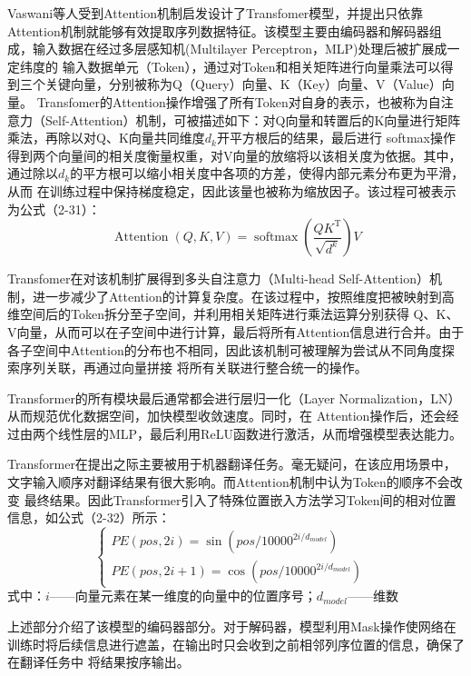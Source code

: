 Vaswani等人\cite{vaswani2017attention}受到Attention机制启发设计了Transfomer模型，并提出只依靠
Attention机制就能够有效提取序列数据特征。该模型主要由编码器和解码器组成，输入数据在经过多层感知机(Multilayer Perceptron，MLP)处理后被扩展成一定纬度的
输入数据单元（Token），通过对Token和相关矩阵进行向量乘法可以得到三个关键向量，分别被称为Q（Query）向量、K（Key）向量、V（Value）向量。
Transfomer的Attention操作增强了所有Token对自身的表示，也被称为自注意力（Self-Attention）机制，可被描述如下：对Q向量和转置后的K向量进行矩阵乘法，再除以对Q、K向量共同维度$d_{k}$开平方根后的结果，最后进行
softmax操作得到两个向量间的相关度衡量权重，对V向量的放缩将以该相关度为依据。其中，通过除以$d_{k}$的平方根可以缩小相关度中各项的方差，使得内部元素分布更为平滑，从而
在训练过程中保持梯度稳定，因此该量也被称为缩放因子。该过程可被表示为公式（2-31）：
\begin{equation}
    \operatorname{Attention}(Q,K,V)=\operatorname{softmax}\left(\frac{QK^\mathrm{T}}{\sqrt{d^k}}\right)V
\end{equation}

Transfomer在对该机制扩展得到多头自注意力（Multi-head Self-Attention）机制，进一步减少了Attention的计算复杂度。在该过程中，按照维度把被映射到高维空间后的Token拆分至子空间，并利用相关矩阵进行乘法运算分别获得
Q、K、V向量，从而可以在子空间中进行计算，最后将所有Attention信息进行合并。由于各子空间中Attention的分布也不相同，因此该机制可被理解为尝试从不同角度探索序列关联，再通过向量拼接
将所有关联进行整合统一的操作。

Transformer的所有模块最后通常都会进行层归一化（Layer Normalization，LN）从而规范优化数据空间，加快模型收敛速度。同时，在
Attention操作后，还会经过由两个线性层的MLP，最后利用ReLU函数进行激活，从而增强模型表达能力。

Transformer在提出之际主要被用于机器翻译任务。毫无疑问，在该应用场景中，文字输入顺序对翻译结果有很大影响。而Attention机制中认为Token的顺序不会改变
最终结果。因此Transformer引入了特殊位置嵌入方法学习Token间的相对位置信息，如公式（2-32）所示：
\begin{equation}
    \begin{cases}PE\left(pos,2i\right)=\sin\left(pos/10000^{2i/d_{model}}\right)\\PE\left(pos,2i+1\right)=\cos\left(pos/10000^{2i/d_{model}}\right)&\end{cases}
\end{equation}
式中：$i$——向量元素在某一维度的向量中的位置序号；$d_{model}$——维数

上述部分介绍了该模型的编码器部分。对于解码器，模型利用Mask操作使网络在训练时将后续信息进行遮盖，在输出时只会收到之前相邻列序位置的信息，确保了在翻译任务中
将结果按序输出。


